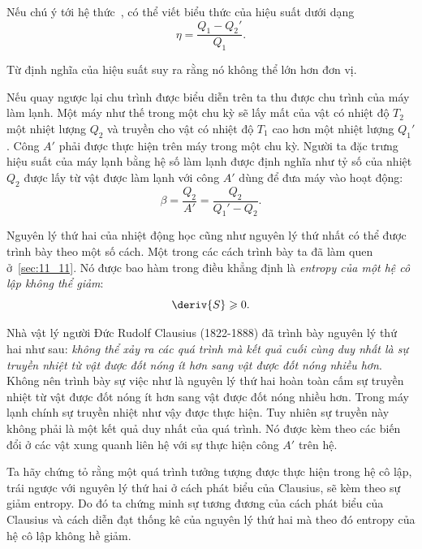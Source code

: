 \noindent
Nếu chú ý tới hệ thức~, có thể viết biểu thức của hiệu suất dưới dạng
\begin{equation}\label{eq:12_5}
	\eta = \frac{Q_1 - Q_2'}{Q_1}.
\end{equation}

\noindent
Từ định nghĩa của hiệu suất suy ra rằng nó không thể lớn hơn đơn vị.

Nếu quay ngược lại chu trình được biểu diễn trên  ta thu được chu trình của máy làm lạnh. Một máy như thế trong một chu kỳ sẽ lấy mất của vật có nhiệt độ $T_2$ một nhiệt lượng $Q_2$ và truyền cho vật có nhiệt độ $T_1$ cao hơn một nhiệt lượng $Q_1' $. Công $A'$ phải được thực hiện trên máy trong một chu kỳ. Người ta đặc trưng hiệu suất của máy lạnh bằng hệ số làm lạnh được định nghĩa như tỷ số của nhiệt $Q_2$ được lấy từ vật được làm lạnh với công $A'$ dùng để đưa máy vào hoạt động:
\begin{equation}\label{eq:12_6}
	\beta = \frac{Q_2}{A'} = \frac{Q_2}{Q_1' - Q_2}.
\end{equation}

Nguyên lý thứ hai của nhiệt động học cũng như nguyên lý thứ nhất có thể được trình bày theo một số cách. Một trong các cách trình bày ta đã làm quen ở~\ref{sec:11_11}. Nó được bao hàm trong điều khẳng định là \textit{entropy của một hệ cô lập không thể giảm}:
\begin{equation}\label{eq:12_7}
	\deriv{S} \geqslant 0.
\end{equation}

Nhà vật lý người Đức Rudolf Clausius (1822-1888) đã trình bày nguyên lý thứ hai như sau: \textit{không thể xảy ra các quá trình mà kết quả cuối cùng duy nhất là sự truyền nhiệt từ vật được đốt nóng ít hơn sang vật được đốt nóng nhiều hơn}. Không nên trình bày sự việc như là nguyên lý thứ hai hoàn toàn cấm sự truyền nhiệt từ vật được đốt nóng ít hơn sang vật được đốt nóng nhiều hơn. Trong máy lạnh chính sự truyền nhiệt như vậy được thực hiện. Tuy nhiên sự truyền này không phải là một kết quả duy nhất của quá trình. Nó được kèm theo các biến đổi ở các vật xung quanh liên hệ với sự thực hiện công $A'$ trên hệ.

Ta hãy chứng tỏ rằng một quá trình tưởng tượng được thực hiện trong hệ cô lập, trái ngược với nguyên lý thứ hai ở cách phát biểu của Clausius, sẽ kèm theo sự giảm entropy. Do đó ta chứng minh sự tương đương của cách phát biểu của Clausius và cách diễn đạt thống kê của nguyên lý thứ hai mà theo đó entropy của hệ cô lập không hề giảm.

